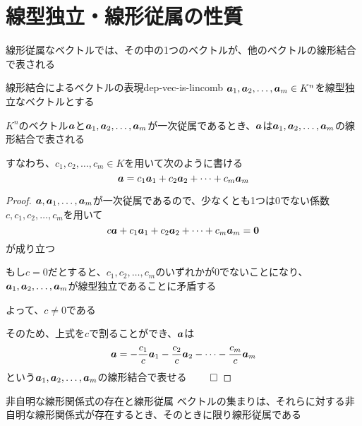 \documentclass[../../../topic_linear-algebra]{subfiles}
\begin{document}
\sectionline
\section{線型独立・線形従属の性質}


\br

線形従属なベクトルでは、その中の1つのベクトルが、他のベクトルの線形結合で表される

\begin{theorem}{線形結合によるベクトルの表現}{dep-vec-is-lincomb}
  $\vb*{a}_1, \vb*{a}_2, \dots, \vb*{a}_m \in K^n$を線型独立なベクトルとする

  $K^n$のベクトル$\vb*{a}$と$\vb*{a}_1, \vb*{a}_2, \dots, \vb*{a}_m$が一次従属であるとき、$\vb*{a}$は$\vb*{a}_1, \vb*{a}_2, \dots, \vb*{a}_m$の線形結合で表される

  すなわち、$c_1, c_2, \dots, c_m \in K$を用いて次のように書ける
  \begin{equation*}
    \vb*{a} = c_1 \vb*{a}_1 + c_2 \vb*{a}_2 + \cdots + c_m \vb*{a}_m
  \end{equation*}
\end{theorem}

\begin{proof}
  $\vb*{a}, \vb*{a}_1,\dots, \vb*{a}_m$が一次従属であるので、少なくとも1つは0でない係数$c, c_1, c_2, \dots, c_m$を用いて
  \begin{equation*}
    c \vb*{a} + c_1 \vb*{a}_1 + c_2 \vb*{a}_2 + \cdots + c_m \vb*{a}_m = \vb*{0}
  \end{equation*}
  が成り立つ

  もし$c=0$だとすると、$c_1,c_2,\dots,c_m$のいずれかが0でないことになり、$\vb*{a}_1, \vb*{a}_2, \dots, \vb*{a}_m$が線型独立であることに矛盾する

  よって、$c \neq 0$である

  そのため、上式を$c$で割ることができ、$\vb*{a}$は
  \begin{equation*}
    \vb*{a} = -\frac{c_1}{c} \vb*{a}_1 - \frac{c_2}{c} \vb*{a}_2 - \cdots - \frac{c_m}{c} \vb*{a}_m
  \end{equation*}
  という$\vb*{a}_1, \vb*{a}_2, \dots, \vb*{a}_m$の線形結合で表せる $\qed$
\end{proof}

\sectionline

\begin{theorem*}{非自明な線形関係式の存在と線形従属}
  ベクトルの集まりは、それらに対する非自明な線形関係式が存在するとき、そのときに限り線形従属である
\end{theorem*}
\end{document}
